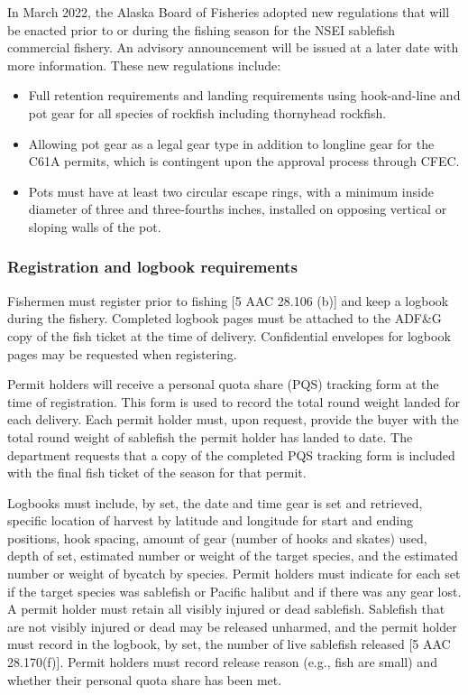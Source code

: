 \documentclass[
]{article}
\providecommand{\tightlist}{%
  \setlength{\itemsep}{0pt}\setlength{\parskip}{0pt}}
\begin{document}
In March 2022, the Alaska Board of Fisheries adopted new regulations
that will be enacted prior to or during the fishing season for the NSEI
sablefish commercial fishery. An advisory announcement will be issued at
a later date with more information. These new regulations include:

\begin{itemize}
\tightlist
\item
  Full retention requirements and landing requirements using
  hook-and-line and pot gear for all species of rockfish including
  thornyhead rockfish.
\item
  Allowing pot gear as a legal gear type in addition to longline gear
  for the C61A permits, which is contingent upon the approval process
  through CFEC.
\item
  Pots must have at least two circular escape rings, with a minimum
  inside diameter of three and three-fourths inches, installed on
  opposing vertical or sloping walls of the pot.
\end{itemize}

\hypertarget{registration-and-logbook-requirements}{%
\subsubsection{Registration and logbook
requirements}\label{registration-and-logbook-requirements}}

Fishermen must register prior to fishing {[}5 AAC 28.106 (b){]} and keep
a logbook during the fishery. Completed logbook pages must be attached
to the ADF\&G copy of the fish ticket at the time of delivery.
Confidential envelopes for logbook pages may be requested when
registering.

Permit holders will receive a personal quota share (PQS) tracking form
at the time of registration. This form is used to record the total round
weight landed for each delivery. Each permit holder must, upon request,
provide the buyer with the total round weight of sablefish the permit
holder has landed to date. The department requests that a copy of the
completed PQS tracking form is included with the final fish ticket of
the season for that permit.

Logbooks must include, by set, the date and time gear is set and
retrieved, specific location of harvest by latitude and longitude for
start and ending positions, hook spacing, amount of gear (number of
hooks and skates) used, depth of set, estimated number or weight of the
target species, and the estimated number or weight of bycatch by
species. Permit holders must indicate for each set if the target species
was sablefish or Pacific halibut and if there was any gear lost. A
permit holder must retain all visibly injured or dead sablefish.
Sablefish that are not visibly injured or dead may be released unharmed,
and the permit holder must record in the logbook, by set, the number of
live sablefish released {[}5 AAC 28.170(f){]}. Permit holders must
record release reason (e.g., fish are small) and whether their personal
quota share has been met.
\end{document}
